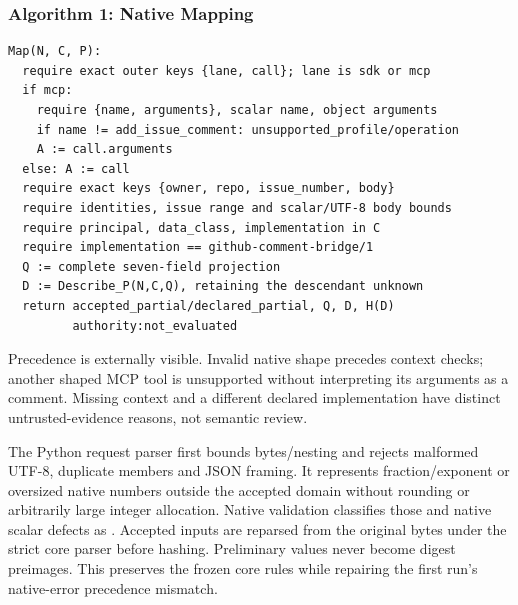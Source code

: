 \documentclass[11pt,letterpaper]{article}
\newcommand{\code}[1]{\texttt{\detokenize{#1}}}
\begin{document}
\par\noindent\begin{minipage}{\linewidth}
\subsubsection*{Algorithm 1: Native Mapping}
\begin{lstlisting}
Map(N, C, P):
  require exact outer keys {lane, call}; lane is sdk or mcp
  if mcp:
    require {name, arguments}, scalar name, object arguments
    if name != add_issue_comment: unsupported_profile/operation
    A := call.arguments
  else: A := call
  require exact keys {owner, repo, issue_number, body}
  require identities, issue range and scalar/UTF-8 body bounds
  require principal, data_class, implementation in C
  require implementation == github-comment-bridge/1
  Q := complete seven-field projection
  D := Describe_P(N,C,Q), retaining the descendant unknown
  return accepted_partial/declared_partial, Q, D, H(D)
         authority:not_evaluated
\end{lstlisting}
\end{minipage}\par

Precedence is externally visible. Invalid native shape precedes context checks;
another shaped MCP tool is unsupported without interpreting its arguments as a
comment. Missing context and a different declared implementation have distinct
untrusted-evidence reasons, not semantic review.

The Python request parser first bounds bytes/nesting and rejects malformed
UTF-8, duplicate members and JSON framing. It represents fraction/exponent or
oversized native numbers outside the accepted domain without rounding or
arbitrarily large integer allocation. Native validation classifies those and
native scalar defects as \code{native_input}. Accepted inputs are reparsed from
the original bytes under the strict core parser before hashing. Preliminary
values never become digest preimages. This preserves the frozen core rules while
repairing the first run's native-error precedence mismatch.
\end{document}
